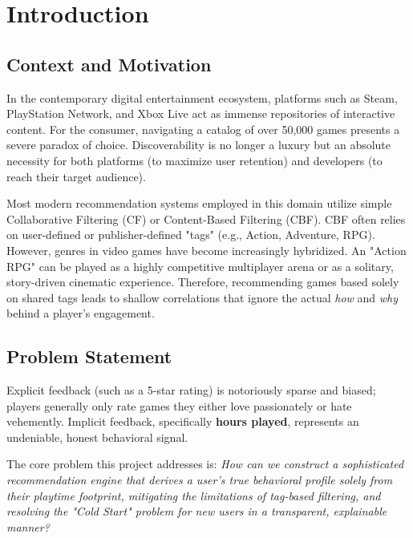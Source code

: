 \documentclass[12pt, a4paper]{report}
\begin{document}
\tableofcontents
\newpage

\chapter{Introduction}
\section{Context and Motivation}
In the contemporary digital entertainment ecosystem, platforms such as Steam, PlayStation Network, and Xbox Live act as immense repositories of interactive content. For the consumer, navigating a catalog of over 50,000 games presents a severe paradox of choice. Discoverability is no longer a luxury but an absolute necessity for both platforms (to maximize user retention) and developers (to reach their target audience).

Most modern recommendation systems employed in this domain utilize simple Collaborative Filtering (CF) or Content-Based Filtering (CBF). CBF often relies on user-defined or publisher-defined "tags" (e.g., Action, Adventure, RPG). However, genres in video games have become increasingly hybridized. An "Action RPG" can be played as a highly competitive multiplayer arena or as a solitary, story-driven cinematic experience. Therefore, recommending games based solely on shared tags leads to shallow correlations that ignore the actual \textit{how} and \textit{why} behind a player's engagement.

\section{Problem Statement}
Explicit feedback (such as a 5-star rating) is notoriously sparse and biased; players generally only rate games they either love passionately or hate vehemently. Implicit feedback, specifically \textbf{hours played}, represents an undeniable, honest behavioral signal. 

The core problem this project addresses is: \textit{How can we construct a sophisticated recommendation engine that derives a user's true behavioral profile solely from their playtime footprint, mitigating the limitations of tag-based filtering, and resolving the "Cold Start" problem for new users in a transparent, explainable manner?}
\end{document}

